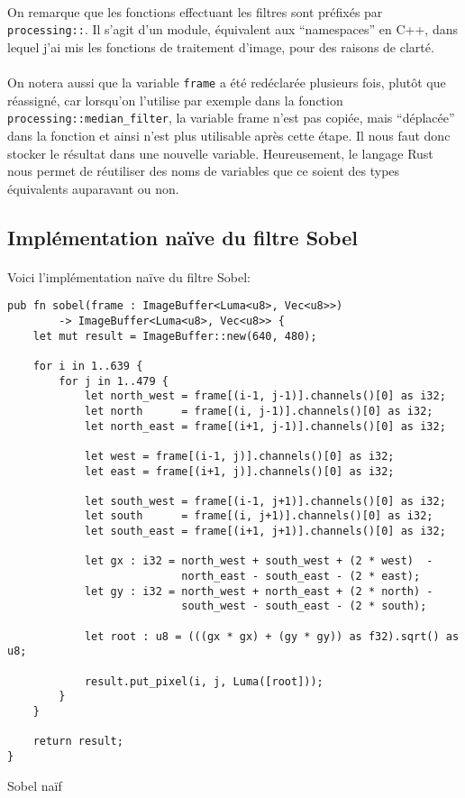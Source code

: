 \documentclass{report}
\begin{document}
\paragraph{} On remarque que les fonctions effectuant les filtres sont préfixés
par \texttt{processing::}. Il s'agit d'un module, équivalent aux
``namespaces'' en C++, dans lequel j'ai mis les fonctions de traitement
d'image, pour des raisons de clarté.

\paragraph{} On notera aussi que la variable \texttt{frame} a été
redéclarée plusieurs fois, plutôt que réassigné, car lorsqu'on l'utilise par
exemple dans la fonction \texttt{processing::median_filter}, la
variable frame n'est pas copiée, mais ``déplacée'' dans la fonction et ainsi
n'est plus utilisable après cette étape. Il nous faut donc stocker le résultat
dans une nouvelle variable. Heureusement, le langage Rust nous permet de
réutiliser des noms de variables que ce soient des types équivalents auparavant
ou non.

\subsection{Implémentation naïve du filtre Sobel}

\paragraph{} Voici l'implémentation naïve du filtre Sobel:\\

\begin{listing}[H]
\begin{verbatim}
pub fn sobel(frame : ImageBuffer<Luma<u8>, Vec<u8>>)
		-> ImageBuffer<Luma<u8>, Vec<u8>> {
	let mut result = ImageBuffer::new(640, 480);

	for i in 1..639 {
		for j in 1..479 {
			let north_west = frame[(i-1, j-1)].channels()[0] as i32;
			let north      = frame[(i, j-1)].channels()[0] as i32;
			let north_east = frame[(i+1, j-1)].channels()[0] as i32;

			let west = frame[(i-1, j)].channels()[0] as i32;
			let east = frame[(i+1, j)].channels()[0] as i32;

			let south_west = frame[(i-1, j+1)].channels()[0] as i32;
			let south      = frame[(i, j+1)].channels()[0] as i32;
			let south_east = frame[(i+1, j+1)].channels()[0] as i32;

			let gx : i32 = north_west + south_west + (2 * west)  -
			               north_east - south_east - (2 * east);
			let gy : i32 = north_west + north_east + (2 * north) -
			               south_west - south_east - (2 * south);

			let root : u8 = (((gx * gx) + (gy * gy)) as f32).sqrt() as u8;

			result.put_pixel(i, j, Luma([root]));
		}
	}

	return result;
}
\end{verbatim}
\label{lst:naive_sobel}
\caption{Sobel naïf}
\end{listing}
\end{document}
